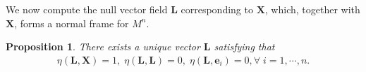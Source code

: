 \documentclass[reqno,11pt, letterpaper]{amsart}
\theoremstyle{plain}
\newtheorem{prop}[thm]{Proposition}
\theoremstyle{definition}
\numberwithin{equation}{section}
\begin{document}
    We now compute the null vector field $\mathbf{L}$ corresponding to $\mathbf{X}$, which, together with $\mathbf{X}$, forms a normal frame for $M^n$.
     \begin{prop}\label{prop-unique}
     	There exists a unique vector $\mathbf{L}$ satisfying that
     	\begin{align*}
     		\eta(\mathbf{L},\mathbf{X})=1,\; \eta(\mathbf{L},\mathbf{L})=0,\;\eta(\mathbf{L},\mathbf{e}_i)=0,\forall\;i=1,\cdots,n.
     	\end{align*}
     \end{prop}
\end{document}
